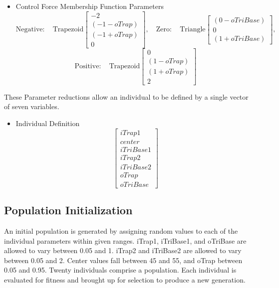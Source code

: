 \documentclass[submit]{aiaa-tc}%
\begin{document}
\begin{itemize}
\item Control Force Membership Function Parameters
 \begin{displaymath}
 \mathrm{Negative:}\quad \mathrm{Trapezoid}\begin{bmatrix}
 -2\\ (-1-oTrap)\\ (-1+oTrap)\\0
 \end{bmatrix},
 \quad
 \mathrm{Zero:}\quad \mathrm{Triangle}\begin{bmatrix}
 (0-oTriBase)\\0\\ (1+oTriBase)
 \end{bmatrix},
  \end{displaymath}
  \begin{displaymath}
 \mathrm{Positive:}\quad \mathrm{Trapezoid}\begin{bmatrix}
 0\\ (1-oTrap)\\ (1+oTrap)\\2
 \end{bmatrix}
 \end{displaymath}
 \end{itemize}
 
These Parameter reductions allow an individual to be defined by a single vector of seven variables.
\begin{itemize}
\item Individual Definition
\begin{displaymath}
\begin{bmatrix}
iTrap1\\ center\\ iTriBase1\\ iTrap2 \\iTriBase2 \\oTrap \\oTriBase
\end{bmatrix}
\end{displaymath}
\end{itemize}
 
\subsection{Population Initialization}
An initial population is generated by assigning random values to each of the individual parameters within given ranges. iTrap1, iTriBase1, and oTriBase are allowed to vary between 0.05 and 1. iTrap2 and iTriBase2 are allowed to vary between 0.05 and 2. Center values fall between 45 and 55, and oTrap between 0.05 and 0.95. Twenty individuals comprise a population. Each individual is evaluated for fitness and brought up for selection to produce a new generation.
\end{document}

